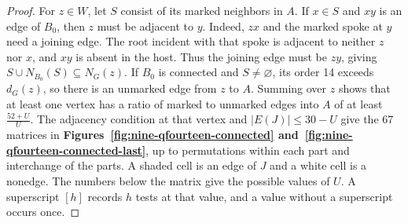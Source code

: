 \documentclass[preprint,11pt,numbers]{elsarticle-arxiv}
\numberwithin{equation}{section}
\theoremstyle{definition}
\begin{document}
\begin{proof}
For $z\in W$, let $S$ consist of its marked neighbors in $A$.
If $x\in S$ and $xy$ is an edge of $B_0$, then $z$ must be adjacent
to $y$. Indeed, $zx$ and the marked spoke at $y$ need a joining
edge. The root incident with that spoke is adjacent to neither $z$
nor $x$, and $xy$ is absent in the host. Thus the joining edge must
be $zy$, giving $S\cup N_{B_0}(S)\subseteq N_G(z)$.
If $B_0$ is connected and $S\ne\varnothing$, its order 14 exceeds
$d_G(z)$, so there is an unmarked edge from $z$ to $A$. Summing over
$z$ shows that at least one vertex has a ratio of marked to unmarked
edges into $A$ of at least $\frac{52+U}{U}$. The adjacency condition
at that vertex and $|E(J)|\leq30-U$ give the 67 matrices in
\textbf{Figures~\ref{fig:nine-qfourteen-connected}
and~\ref{fig:nine-qfourteen-connected-last}}, up to permutations within
each part and interchange of the parts. A shaded cell is an edge of
$J$ and a white cell is a nonedge. The numbers below the matrix give
the possible values of $U$. A superscript $[h]$ records $h$ tests
at that value, and a value without a superscript occurs once.


\end{proof}
\end{document}

